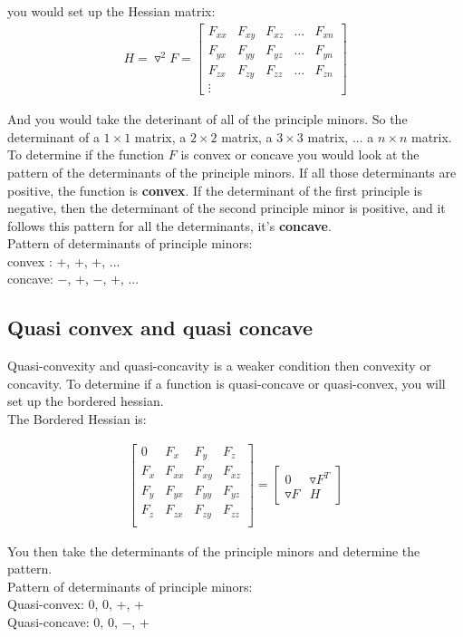 \documentclass{article}
\begin{document}
you would set up the Hessian matrix: 
\begin{align}
    H = \triangledown^2 F = \begin{bmatrix}
        F_{xx} &  F_{xy} & F_{xz} & ... & F_{xn} \\
        F_{yx} & F_{yy} &F_{yz} & ... & F_{yn}\\
        F_{zx} & F_{zy} &F_{zz} & ... & F_{zn}\\
        \vdots & & & & 
    \end{bmatrix}
\end{align}

And you would take the deterinant of all of the principle minors. So the determinant of a $1 \times 1$ matrix, a $2 \times 2$ matrix, a $3 \times 3$ matrix, ... a $n \times n$ matrix. \\

To determine if the function $F$ is convex or concave you would look at the pattern of the determinants of the principle minors. If all those determinants are positive, the function is \textbf{convex}. If the determinant of the first principle is negative, then the determinant of the second principle minor is positive, and it follows this pattern for all the determinants, it's \textbf{concave}. \\

Pattern of determinants of principle minors:\\
convex : +, +, +, ...\\
concave: $-$, +, $-$, +, ...

\subsection{Quasi convex and quasi concave}

Quasi-convexity and quasi-concavity is a weaker condition then convexity or concavity. To determine if a function is quasi-concave or quasi-convex, you will set up the bordered hessian. \\

The Bordered Hessian is: 

\begin{align}
    \begin{bmatrix}
        0 & F_{x} & F_{y} & F_{z}\\
        F_{x} & F_{xx} &  F_{xy} & F_{xz}\\
        F_{y} & F_{yx} & F_{yy} &F_{yz}\\
        F_{z} & F_{zx} & F_{zy} &F_{zz}\\
    \end{bmatrix} = 
    \begin{bmatrix}
        0 & \triangledown F^T\\
        \triangledown F & H
    \end{bmatrix}
\end{align}

You then take the determinants of the principle minors and determine the pattern. \\

Pattern of determinants of principle minors:\\
Quasi-convex: 0, 0, +, + \\
Quasi-concave: 0, 0, $-$, +
\end{document}
